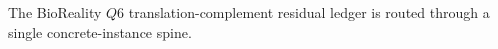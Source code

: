 The BioReality $Q6$ translation-complement residual ledger is routed through a single concrete-instance spine.
